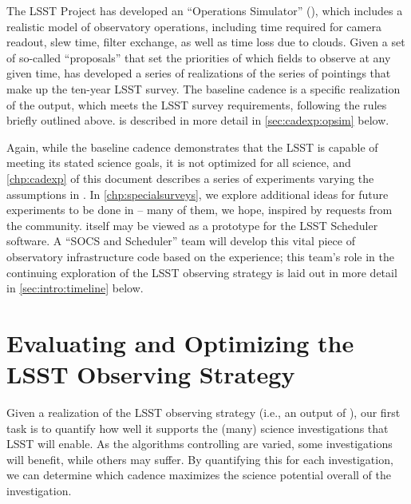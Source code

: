 The LSST Project has developed an ``Operations Simulator'' (\OpSim),
which
includes a realistic model of observatory operations, including time
required for camera readout, slew time, filter exchange, as well as time
loss due to clouds.  Given a set of so-called ``proposals''
that set the priorities of which fields to
observe at any given time, \OpSim has developed a series of realizations
of the series of pointings that make up the ten-year LSST survey.
The baseline cadence is a specific realization of the
\OpSim output, which meets the LSST survey requirements, following the
rules briefly outlined above. \OpSim is described in more detail in \autoref{sec:cadexp:opsim} below.

Again, while the baseline cadence demonstrates that the LSST is capable
of meeting its stated science goals, it is not optimized for all
science, and \autoref{chp:cadexp} of this document describes a
series of experiments varying the assumptions in \OpSim.  In
\autoref{chp:specialsurveys}, we explore additional ideas for future
experiments to be done in \OpSim -- many of them, we hope, inspired by
requests from the community.
\OpSim itself may be viewed as a prototype for the LSST Scheduler
software. A ``SOCS and Scheduler'' team will develop this vital piece of
observatory infrastructure code based on the \OpSim experience; this
team's role in the continuing exploration of the LSST observing strategy
is laid out in more detail in \autoref{sec:intro:timeline} below.

\navigationbar


\section{Evaluating and Optimizing the LSST Observing Strategy}
\def\secname{intro:evaluation}\label{sec:\secname}


Given a realization of the LSST observing strategy (i.e., an output of
\OpSim), our first task is to quantify how well it supports the (many)
science investigations that LSST will enable.  As the algorithms controlling
\OpSim are varied, some investigations will benefit, while others may suffer.
By quantifying this for each investigation, we can determine which cadence
maximizes the science potential overall of the investigation.

